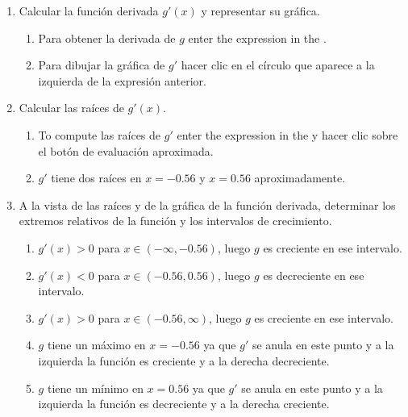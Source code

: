 \begin{enumerate}[leftmargin=*]
\begin{enumerate}
      \item Calcular la función derivada $g'(x)$ y representar su gráfica.
            \begin{indication}
            \begin{enumerate}
            \item Para obtener la derivada de $g$ enter the expression  in the .
            \item Para dibujar la gráfica de $g'$ hacer clic en el círculo que aparece a la izquierda de la expresión anterior.
            \end{enumerate}
            \end{indication}

      \item Calcular las raíces de $g'(x).$
            \begin{indication}
            \begin{enumerate}
            \item To compute las raíces de $g'$ enter the expression  in the  y hacer clic sobre el botón de evaluación aproximada.
            \item $g'$ tiene dos raíces en $x=-0.56$ y $x=0.56$ aproximadamente.
            \end{enumerate}
            \end{indication}

      \item  A la vista de las raíces y de la gráfica de la función derivada, determinar los extremos relativos de la función y los intervalos de crecimiento.
            \begin{indication}
            \begin{enumerate}
            \item $g'(x)>0$ para $x\in (-\infty, -0.56)$, luego $g$ es creciente en ese intervalo.
            \item $g'(x)<0$ para $x\in (-0.56, 0.56)$, luego $g$ es decreciente en ese intervalo.
            \item $g'(x)>0$ para $x\in (-0.56, \infty)$, luego $g$ es creciente en ese intervalo.
            \item $g$ tiene un máximo en $x=-0.56$ ya que $g'$ se anula en este punto y a la izquierda la función es creciente y a la derecha decreciente.
            \item $g$ tiene un mínimo en $x=0.56$ ya que $g'$ se anula en este punto y a la izquierda la función es decreciente y a la derecha creciente.
            \end{enumerate}
            \end{indication}


\end{enumerate}
\end{enumerate}
